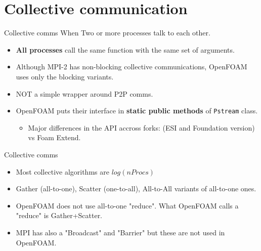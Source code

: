 \section{Collective communication}

\begin{frame}[fragile]{Collective comms}
    When Two or more processes talk to each other.
    \begin{itemize}
        \item {\bf All processes} call the same function with the same set of arguments. 
        \item Although MPI-2 has non-blocking collective communications, OpenFOAM uses only the blocking variants.
        \item NOT a simple wrapper around P2P comms.
        \item OpenFOAM puts their interface in {\bf static public methods} of {\tt Pstream} class.
        \begin{itemize}
            \item Major differences in the API accross forks: (ESI and Foundation version) vs Foam Extend.
        \end{itemize}
    \end{itemize}
\end{frame}

\begin{frame}[fragile]{Collective comms}
    \begin{itemize}
        \item Most collective algorithms are $log(nProcs)$
        \item Gather (all-to-one), Scatter (one-to-all), All-to-All variants of all-to-one ones.
        \item OpenFOAM does not use all-to-one "reduce". What OpenFOAM calls a "reduce" is Gather+Scatter.
        \item MPI has also a "Broadcast" and "Barrier" but these are not used in OpenFOAM.
    \end{itemize}
\end{frame}

